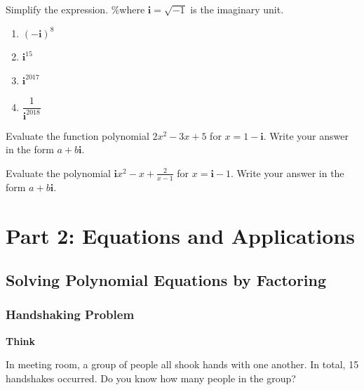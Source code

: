 \documentclass[en,12pt]{elegantbook}
\providecommand{\tightlist}{%
  \setlength{\itemsep}{0pt}\setlength{\parskip}{0pt}}
\newcommand{\ii}{\mathbf{i}}
\newenvironment{rmdthink}{
	\par\noindent
	{
		\makebox[-\width][r]{
			\footnotesize
			\color{green!90}\faLightbulbO
			\hspace*{3pt}
		}
			\textbf{
				\color{second}
				Think 
			}
    }
    \begin{shaded}
    \sffamily
}{
    \par\medskip\ignorespacesafterend
    \end{shaded}
}
\providecommand{\tightlist}{%
  \setlength{\itemsep}{0pt}\setlength{\parskip}{0pt}}
\let\BeginKnitrBlock\begin \let\EndKnitrBlock\end
\begin{document}
\BeginKnitrBlock{exercise}
\protect\hypertarget{exr:unnamed-chunk-108}{}{\label{exr:unnamed-chunk-108} }
Simplify the expression. \%where \(\ii=\sqrt{-1}\) is the imaginary unit.

\begin{enumerate}
\def\labelenumi{\arabic{enumi}.}
\tightlist
\item
  \((-\ii)^{8}\)
\item
  \(\ii^{15}\)
\item
  \(\ii^{2017}\)
\item
  \(\dfrac1{\ii^{2018}}\)
\end{enumerate}
\EndKnitrBlock{exercise}

\BeginKnitrBlock{exercise}
\protect\hypertarget{exr:unnamed-chunk-109}{}{\label{exr:unnamed-chunk-109} }
Evaluate the function polynomial \(2x^2-3x+5\) for \(x=1-\ii\).
Write your answer in the form \(a+b\ii\).
\EndKnitrBlock{exercise}

\BeginKnitrBlock{exercise}
\protect\hypertarget{exr:unnamed-chunk-110}{}{\label{exr:unnamed-chunk-110} }
Evaluate the polynomial \(\ii x^2-x+\frac{2}{x-1}\) for \(x=\ii-1\).
Write your answer in the form \(a+b\ii\).
\EndKnitrBlock{exercise}

\hypertarget{part-part-2-equations-and-applications}{%
\part*{Part 2: Equations and Applications}\label{part-part-2-equations-and-applications}}

\hypertarget{solving-polynomial-equations-by-factoring}{%
\chapter{Solving Polynomial Equations by Factoring}\label{solving-polynomial-equations-by-factoring}}

\hypertarget{handshaking-problem}{%
\section{Handshaking Problem}\label{handshaking-problem}}

\begin{rmdthink}

In meeting room, a group of people all shook hands with one another. In total, 15 handshakes occurred. Do you know how many people in the group?

\end{rmdthink}
\end{document}
